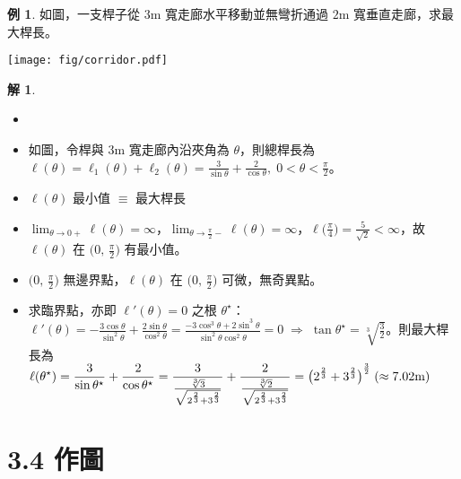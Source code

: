 \documentclass[12pt]{extarticle}
\newcommand{\ds}{\displaystyle}
\newcommand{\ie}{\;\Longrightarrow\;}
\theoremstyle{definition}
\newtheorem*{ex}{例}
\newtheorem*{sol}{解}
\newcommand{\myline}{\noindent\makebox[\linewidth]{\rule{\paperwidth}{0.4pt}}}
\begin{document}
\begin{ex}
  如圖，一支桿子從 $3$m 寬走廊水平移動並無彎折通過 $2$m 寬垂直走廊，求最大桿長。
  \begin{center}
    \texttt{[image: fig/corridor.pdf]}
  \end{center}
\end{ex}

\begin{sol}
  \begin{itemize}\setlength\itemsep{0em}
    \item[]
    \item 如圖，令桿與 $3$m 寬走廊內沿夾角為 $\theta$，則總桿長為 $\ds \ell(\theta) = \ell_1(\theta) +\ell_2(\theta) = \frac{3}{\sin\theta}+\frac{2}{\cos\theta},\;0 < \theta < \frac{\pi}{2}$。
    \item $\ds\ell(\theta)$ 最小值 $\equiv$ 最大桿長 
    \item $\ds\lim_{\theta\to 0+}\ell(\theta) = \infty$，$\ds\lim_{\theta\to\frac{\pi}{2}-}\ell(\theta) = \infty$，$\ds\ell\big(\frac{\pi}{4}\big) = \frac{5}{\sqrt{2}} < \infty$，故 $\ell(\theta)$ 在 $\ds\big(0,\,\frac{\pi}{2}\big)$ 有最小值。
    \item $\ds\big(0,\,\frac{\pi}{2}\big)$ 無邊界點，$\ds\ell(\theta)$ 在 $\ds\big(0,\,\frac{\pi}{2}\big)$ 可微，無奇異點。
    \item 求臨界點，亦即 $\ds\ell'(\theta) = 0$ 之根 $\theta^\star$：$\ds\ell'(\theta) = -\frac{3 \cos\theta}{\sin^2\theta} + \frac{2\sin\theta}{\cos^2\theta} = \frac{-3\cos^3\theta +2 \sin^3\theta}{\sin^2\theta\cos^2\theta} = 0\ie\tan\theta^\star = \sqrt[3]{\frac{3}{2}}$。則最大桿長為 $\ds\ell(\theta^\star) = \frac{3}{\sin\theta^\star} + \frac{2}{\cos\theta^\star} =\frac{3}{\frac{\root 3\of 3}{\sqrt{2^{\frac{2}{3}}+3^{\frac{2}{3}}}}} +\frac{2}{\frac{\root 3\of 2}{\sqrt{2^{\frac{2}{3}}+3^{\frac{2}{3}}}}} = {\big(2^{\frac{2}{3}}+3^{\frac{2}{3}}\big)}^{\frac{3}{2}}\;(\approx 7.02 \text{m})$
  \end{itemize}
\end{sol}

\myline

\section*{3.4 作圖}

\vspace{1em}
\end{document}

